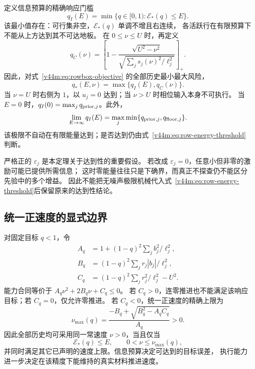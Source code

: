 \documentclass[11pt,a4paper]{article}
\numberwithin{equation}{section}
\theoremstyle{definition}
\begin{document}
定义信息预算的精确响应门槛
\begin{equation}
 q_I(E)=\min\{q\in[0,1):\mathcal E_*(q)\le E\}.
 \label{v44m:eq:information-risk}
\end{equation}
该最小值存在：可行集非空，$\mathcal E_*(q)$ 单调不增且右连续，
各活跃行在有限预算下不能从上方达到其不可达地板。
在 $0\le\nu\le U$ 时，再定义
\begin{equation}
 q_C(\nu)=
 \left[1-
 \frac{\sqrt{U^2-\nu^2}}
 {\sqrt{\sum_j s_j(\nu)^2/\ell_j^2}}
 \right]_+.
 \label{v44m:eq:capacity-risk}
\end{equation}
因此，对式~\eqref{v44m:eq:rowbox-objective} 的全部历史最小最大风险，
\begin{equation}
 \boxed{q_*(E,\nu)=\max\{q_I(E),q_C(\nu)\}.}
 \label{v44m:eq:full-minimax-risk}
\end{equation}
当 $\nu=U$ 时右侧为 $1$，以 $u_j=0$ 达到；当 $\nu>U$ 时相位输入本身不可执行。
当 $E=0$ 时，$q_I(0)=\max_jq_{{\rm prior},j}$。此外，
\begin{equation}
 \lim_{E\to\infty}q_I(E)
 =\max_j\min\{q_{{\rm prior},j},q_{{\rm floor},j}\}.
 \label{v44m:eq:infinite-energy-floor}
\end{equation}
该极限不自动在有限能量达到；是否达到仍由式~\eqref{v44m:eq:row-energy-threshold}判断。

严格正的 $\varepsilon_j$ 是本定理关于达到性的重要假设。
若改成 $\varepsilon_j=0$，任意小但非零的激励可能已提供所需信息；
这时零能量往往只是下确界，而真正不探查仍不能区分先验中的多个增益。
因此不能把无噪声极限机械代入式~\eqref{v44m:eq:row-energy-threshold}后保留原来的达到性结论。

\subsection{统一正速度的显式边界}

对固定目标 $q<1$，令
\begin{align}
 A_q&=1+(1-q)^2\sum_j b_j^2/\ell_j^2,\\
 B_q&=(1-q)^2\sum_j r_j|b_j|/\ell_j^2,\\
 C_q&=(1-q)^2\sum_j r_j^2/\ell_j^2-U^2.
 \label{v44m:eq:speed-polynomial}
\end{align}
能力合同等价于 $A_q\nu^2+2B_q\nu+C_q\le0$。
若 $C_q>0$，连零推进也不能满足该响应目标；若 $C_q=0$，仅允许零推进。
若 $C_q<0$，统一正速度的精确上限为
\begin{equation}
 \boxed{
 \nu_{\max}(q)
 =\frac{-B_q+\sqrt{B_q^2-A_qC_q}}{A_q}>0.}
 \label{v44m:eq:uniform-speed-root}
\end{equation}
因此全部历史均可采用同一常速度 $\nu>0$，当且仅当
\begin{equation}
 \mathcal E_*(q)\le E,\qquad
 0<\nu\le\nu_{\max}(q),
\end{equation}
并同时满足其它已声明的速度上限。信息预算决定可达到的目标误差，
执行能力进一步决定在该精度下能维持的真实材料推进速度。
\end{document}
